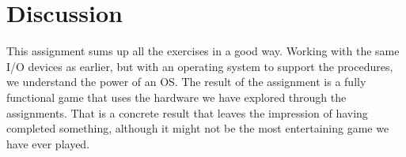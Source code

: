 \section{Discussion}
This assignment sums up all the exercises in a good way. Working with the same I/O devices as earlier, but with an operating system to support the procedures, we understand the power of an OS. The result of the assignment is a fully functional game that uses the hardware we have explored through the assignments. That is a concrete result that leaves the impression of having completed something, although it might not be the most entertaining game we have ever played.